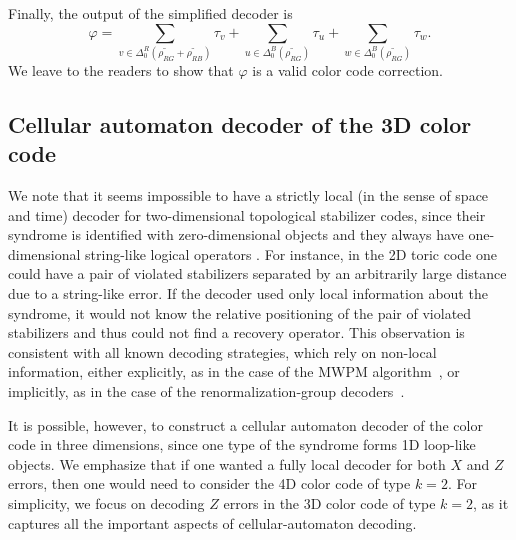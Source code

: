 \documentclass[onecolumn,letterpaper,11pt,accepted=2022-12-19]{quantumarticle}
\newcommand{\facex}[3]{{\Delta^{#1}_{#2}(#3)}}
\renewcommand{\phi}{\varphi}
\theoremstyle{definition}
\theoremstyle{lemma}
\theoremstyle{theorem}
\theoremstyle{corollary}
\begin{document}
{Finally, the output of the simplified decoder is
\begin{equation}
\phi = \sum_{v \in\facex R 0 {\widetilde{\rho_{RG}} + \widetilde{\rho_{RB}}}} \tau_v
+ \sum_{u \in\facex B 0 {\widetilde{\rho_{RG}}}} \tau_u+ \sum_{w \in\facex B 0 {\widetilde{\rho_{RG}}}} \tau_w.
\end{equation}
We leave to the readers to show that $\phi$ is a valid color code correction.





\subsection{Cellular automaton decoder of the 3D color code}
\label{sec_CA_decoder}

We note that it seems impossible to have a strictly local (in the sense of space and time) decoder for two-dimensional topological stabilizer codes, since their syndrome is identified with zero-dimensional objects and they always have one-dimensional string-like logical operators \cite{Bombin2014, Yoshida2011, Haah2013}.
For instance, in the 2D toric code one could have a pair of violated stabilizers separated by an arbitrarily large distance due to a string-like error.
If the decoder used only local information about the syndrome, it would not know the relative positioning of the pair of violated stabilizers and thus could not find a recovery operator.
This observation is consistent with all known decoding strategies, which rely on non-local information, either explicitly, as in the case of the MWPM algorithm~\cite{Dennis2002}, or implicitly, as in the case of the renormalization-group decoders~\cite{Harrington2004,Duclos-Cianci2010,Bravyi2013a,Anwar2013}.


It is possible, however, to construct a cellular automaton decoder of the color code in three dimensions, since one type of the syndrome forms 1D loop-like objects.
We emphasize that if one wanted a fully local decoder for both $X$ and $Z$ errors, then one would need to consider the 4D color code of type $k=2$.
For simplicity, we focus on decoding $Z$ errors in the 3D color code of type $k=2$, as it captures all the important aspects of cellular-automaton decoding.


}
\end{document}
